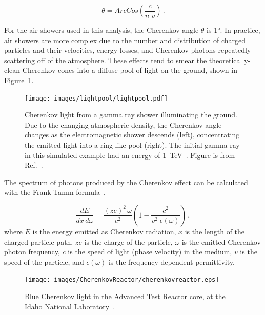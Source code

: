   \begin{equation}\label{eqn:cherenkovangle}
    \theta = ArcCos \left ( \frac{c}{n \; v} \right ) \,.
  \end{equation}
  
  For the air showers used in this analysis, the Cherenkov angle $\theta$ is \nicetilde\ang{1}.
  In practice, air showers are more complex due to the number and distribution of charged particles and their velocities, energy losses, and Cherenkov photons repeatedly scattering off of the atmosphere.
  These effects tend to smear the theoretically-clean Cherenkov cones into a diffuse pool of light on the ground, shown in Figure~\ref{fig:lightpool}.

  \begin{figure}[!t]
    \centering
    \texttt{[image: images/lightpool/lightpool.pdf]}
    \caption[Cherenkov Light Pool]{
      Cherenkov light from a gamma ray shower illuminating the ground.
      Due to the changing atmospheric density, the Cherenkov angle changes as the electromagnetic shower descends (left), concentrating the emitted light into a ring-like pool (right).
      The initial gamma ray in this simulated example had an energy of \SI{1}{\TeV{}}.
      Figure is from Ref.~\cite{Voelk}.
    }
    \label{fig:lightpool}
  \end{figure}
  
  The spectrum of photons produced by the Cherenkov effect can be calculated with the Frank-Tamm formula~\cite{franktamm1,franktamm2},
  
  \begin{equation}\label{eqn:franktamm}
    \frac{dE}{dx\,d\omega}=\frac{(ze)^2 \, \omega}{c^2} \left ( 1 - \frac{c^2}{v^2 \;\epsilon(\omega)} \right ) \,,
  \end{equation}
  where $E$ is the energy emitted as Cherenkov radiation, $x$ is the length of the charged particle path, $ze$ is the charge of the particle, $\omega$ is the emitted Cherenkov photon frequency, $c$ is the speed of light (phase velocity) in the medium, $v$ is the speed of the particle, and $\epsilon(\omega)$ is the frequency-dependent permittivity.
  
  \begin{figure}[!t]
    \centering
    \texttt{[image: images/CherenkovReactor/cherenkovreactor.eps]}
    \caption[Cherenkov Light from a Reactor]{
      Blue Cherenkov light in the Advanced Test Reactor core, at the Idaho National Laboratory~\cite{cherenkovreactor,atrlab}.
    }
    \label{fig:cherenkovreactor}
  \end{figure}
  
